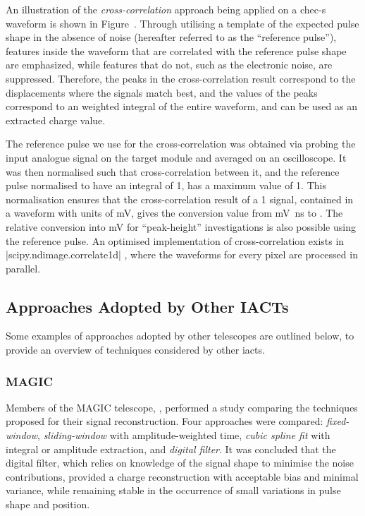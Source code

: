 An illustration of the \textit{cross-correlation} approach being applied on a \gls{chec-s} waveform is shown in Figure~. Through utilising a template of the expected pulse shape in the absence of noise (hereafter referred to as the ``reference pulse''), features inside the waveform that are correlated with the reference pulse shape are emphasized, while features that do not, such as the electronic noise, are suppressed. Therefore, the peaks in the cross-correlation result correspond to the displacements where the signals match best, and the values of the peaks correspond to an weighted integral of the entire waveform, and can be used as an extracted charge value.

The reference pulse we use for the cross-correlation was obtained via probing the input analogue signal on the \gls{target} module and averaged on an oscilloscope. It was then normalised such that cross-correlation between it, and the reference pulse normalised to have an integral of 1, has a maximum value of 1. This normalisation ensures that the cross-correlation result of a \SI{1}{\pe} signal, contained in a waveform with units of \si{mV}, gives the conversion value from \si{mV ns} to \si{\pe}. The relative conversion into \si{mV} for ``peak-height'' investigations is also possible using the reference pulse. An optimised implementation of cross-correlation exists in |scipy.ndimage.correlate1d| \cite{scipy-crosscorrelate}, where the waveforms for every pixel are processed in parallel.


\subsection{Approaches Adopted by Other IACTs}

Some examples of approaches adopted by other telescopes are outlined below, to provide an overview of techniques considered by other \glspl{iact}.

\subsubsection{MAGIC}

Members of the MAGIC telescope, \textcite{Albert2008}, performed a study comparing the techniques proposed for their signal reconstruction. Four approaches were compared: \textit{fixed-window}, \textit{sliding-window} with amplitude-weighted time, \textit{cubic spline fit} with integral or amplitude extraction, and \textit{digital filter}. It was concluded that the digital filter, which relies on knowledge of the signal shape to minimise the noise contributions, provided a charge reconstruction with acceptable bias and minimal variance, while remaining stable in the occurrence of small variations in pulse shape and position.

